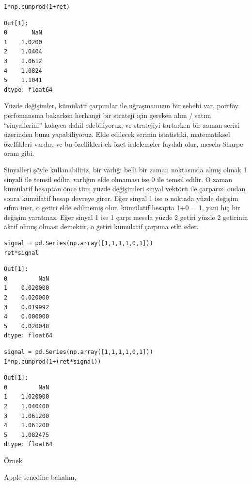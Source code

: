 \documentclass[12pt,fleqn]{article}\usepackage{../../common}
\begin{document}
\begin{verbatim}
1*np.cumprod(1+ret)
\end{verbatim}

\begin{verbatim}
Out[1]: 
0       NaN
1    1.0200
2    1.0404
3    1.0612
4    1.0824
5    1.1041
dtype: float64
\end{verbatim}

Yüzde değişimler, kümülatif çarpımlar ile uğraşmamızın bir sebebi var, portföy
perfomansına bakarken herhangi bir strateji için gereken alım / satım
``sinyallerini'' kolayca dahil edebiliyoruz, ve stratejiyi tartarken bir zaman
serisi üzerinden bunu yapabiliyoruz. Elde edilecek serinin istatistiki,
matematiksel özellikleri vardır, ve bu özellikleri ek özet irdelemeler
faydalı olur, mesela Sharpe oranı gibi.

Sinyalleri şöyle kullanabiliriz, bir varlığı belli bir zaman noktasında almış
olmak 1 sinyali ile temsil edilir, varlığın elde olmaması ise 0 ile temsil
edilir.  O zaman kümülatif hesaptan önce tüm yüzde değişimleri sinyal vektörü
ile çarparız, ondan sonra kümülatif hesap devreye girer. Eğer sinyal 1 ise o
noktada yüzde değişim sıfıra iner, o getiri elde edilmemiş olur, kümülatif
hesapta 1+0 = 1, yani hiç bir değişim yaratmaz. Eğer sinyal 1 ise 1 çarpı mesela
yüzde 2 getiri yüzde 2 getirinin aktif olmuş olması demektir, o getiri kümülatif
çarpıma etki eder.

\begin{verbatim}
signal = pd.Series(np.array([1,1,1,1,0,1]))
ret*signal
\end{verbatim}

\begin{verbatim}
Out[1]: 
0         NaN
1    0.020000
2    0.020000
3    0.019992
4    0.000000
5    0.020048
dtype: float64
\end{verbatim}

\begin{verbatim}
signal = pd.Series(np.array([1,1,1,1,0,1]))
1*np.cumprod(1+(ret*signal))
\end{verbatim}

\begin{verbatim}
Out[1]: 
0         NaN
1    1.020000
2    1.040400
3    1.061200
4    1.061200
5    1.082475
dtype: float64
\end{verbatim}

Örnek

Apple senedine bakalım,
\end{document}
